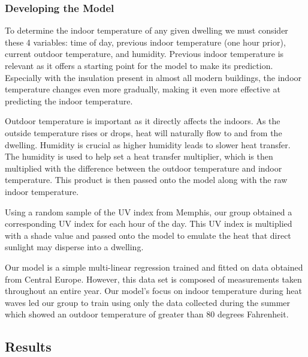 \documentclass[12pt]{article}
\begin{document}
\subsubsection{Developing the Model}
\par To determine the indoor temperature of any given dwelling we must consider these 4 variables: time of  day, previous indoor temperature (one hour prior), current outdoor temperature, and humidity. Previous indoor temperature is relevant as it offers a starting point for the model to make its prediction. Especially with the insulation present in almost all modern buildings, the indoor temperature changes even more gradually, making it even more effective at predicting the indoor temperature.\cite{https://www.lbl.gov}\cite{https://www.energy.gov}
\par Outdoor temperature is important as it directly affects the indoors. As the outside temperature rises or drops, heat will naturally flow to and from the dwelling.\cite{https://www.engineeringtoolbox.com/conduction-heat-transfer-d_430.html}
Humidity is crucial as higher humidity leads to slower heat transfer. The humidity is used to help set a heat transfer multiplier, which is then multiplied with the difference between the outdoor temperature and indoor temperature. This product is then passed onto the model along with the raw indoor temperature.\cite{https://www.sciencedirect.com/science/article/pii/S0378778819312169}
\par Using a random sample of the UV index from Memphis, our group obtained a corresponding UV index for each hour of the day. This UV index is multiplied with a shade value and passed onto the model to emulate the heat that direct sunlight may disperse into a dwelling. \cite{https://www.uvindextoday.com/usa/tennessee/shelby-county/memphis-uv-index}\cite{https://www.epa.gov/sunsafety/uv-index}
\par Our model is a simple multi-linear regression trained and fitted on data obtained from Central Europe. However, this data set is composed of measurements taken throughout an entire year. Our model’s focus on indoor temperature during heat waves led our group to train using only the data collected during the summer which showed an outdoor temperature of greater than 80 degrees Fahrenheit.\cite{https://www.mdpi.com/2071-1050/11/15/4092}

\subsection{Results}
\end{document}
